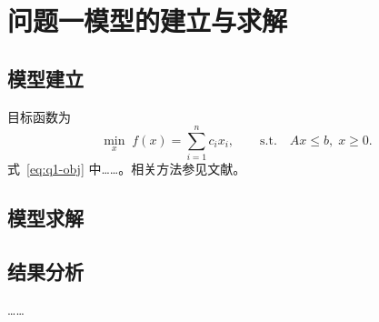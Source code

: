 \section{问题一模型的建立与求解}

\subsection{模型建立}

目标函数为
\begin{equation}
  \min_{x}\; f(x)=\sum_{i=1}^{n} c_i x_i ,
  \qquad \text{s.t.}\quad Ax\le b,\; x\ge 0 .
  \label{eq:q1-obj}
\end{equation}
式~\eqref{eq:q1-obj} 中……。相关方法参见文献\cite{ref-book}\cite{ref-journal}。

\subsection{模型求解}


\subsection{结果分析}

……

